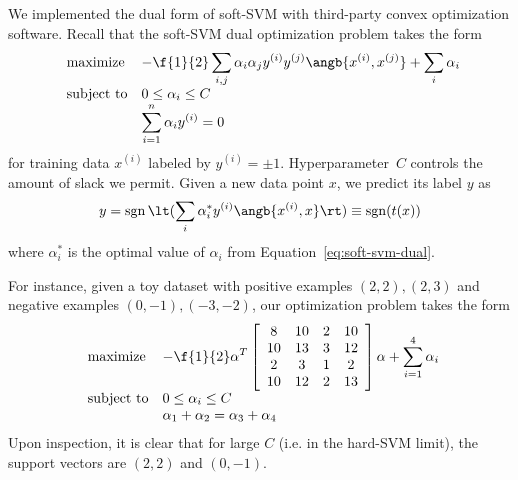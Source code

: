 \documentclass{article}
\DeclareMathOperator{\sgn}{sgn}
\newcommand{\sind}[1]{^{(#1)}}
\begin{document}
\begin{multicols}{2}
We implemented the dual form of soft-SVM
with third-party convex optimization software.
Recall that the soft-SVM dual optimization problem takes the form
\begin{equation}
    \label{eq:soft-svm-dual}
    \begin{array}{ll@{}ll}
        \text{maximize}  &\displaystyle -\f{1}{2}\sum_{i,j} \alpha_i \alpha_j y\sind{i} y\sind{j} \angb{x\sind{i}, x\sind{j}}
        +
        \sum_i \alpha_i \\
        \text{subject to}& 0 \le \alpha_i \le C\\
        & \displaystyle\sum_{i=1}^n \alpha_i y\sind{i} = 0
    \end{array}
\end{equation}
for training data $x\sind{i}$
labeled by $y\sind i = \pm 1$.
Hyperparameter~$C$ controls the amount of slack we permit.
Given a new data point $x$,
we predict its label $y$ as
\begin{equation}
    \label{eq:soft-svm-predict}
    y = \sgn\lt(\sum_i \alpha^*_i y\sind{i} \angb{x\sind{i}, x}\rt) \equiv \sgn(t(x))
\end{equation}
where $\alpha^*_i$ is the optimal value of $\alpha_i$
from Equation~\ref{eq:soft-svm-dual}.

For instance, given a toy dataset with positive examples
$(2, 2), (2, 3)$ and negative examples $(0, -1), (-3, -2)$,
our optimization problem takes the form
\begin{equation}
    \label{eq:soft-svm-dual-concrete}
    \begin{array}{ll@{}ll}
        \text{maximize}  &\displaystyle -\f{1}{2}\alpha^T
        \left[
            \begin{array}{cccc}
                8 & 10 & 2 & 10 \\
                10 & 13 & 3 & 12 \\
                2 & 3 & 1 & 2 \\
                10 & 12 & 2 & 13
            \end{array}
        \right]
        \alpha
        +
        \sum_{i=1}^4 \alpha_i \\
        \text{subject to}& 0 \le \alpha_i \le C\\
        & \alpha_1 + \alpha_2 = \alpha_3 + \alpha_4
    \end{array}
\end{equation}
Upon inspection,
it is clear that for large $C$
(i.e. in the hard-SVM limit),
the support vectors are $(2,2)$ and $(0,-1)$.



\end{multicols}
\end{document}
